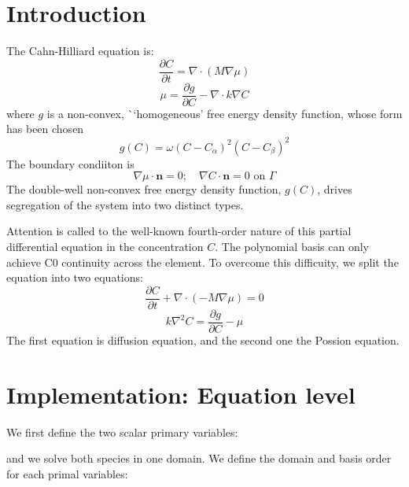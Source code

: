\hypertarget{growth_Introduction}{}\section{Introduction}\label{growth_Introduction}
The Cahn-\/\+Hilliard equation is\+: \[ \frac{\partial C}{\partial t}=\nabla\cdot(M\nabla\mu) \] \[ \mu=\frac{\partial g}{\partial C}-\nabla\cdot k\nabla C \] where $g$ is a non-\/convex, \`{}`homogeneous'\textquotesingle{} free energy density function, whose form has been chosen \[ g(C)=\omega(C-C_\alpha)^2(C-C_\beta)^2 \] The boundary condiiton is \[ \nabla\mu\cdot\boldsymbol{n}=0;\quad \nabla C\cdot\boldsymbol{n}=0 \text{ on }\Gamma \] The double-\/well non-\/convex free energy density function, $g(C)$, drives segregation of the system into two distinct types.

Attention is called to the well-\/known fourth-\/order nature of this partial differential equation in the concentration $C$. The polynomial basis can only achieve C0 continuity across the element. To overcome this difficuity, we split the equation into two equations\+: \[ \frac{\partial C}{\partial t}+\nabla\cdot(-M\nabla\mu)=0 \] \[ k\nabla^2 C=\frac{\partial g}{\partial C}-\mu \] The first equation is diffusion equation, and the second one the Possion equation. \hypertarget{growth_imple}{}\section{Implementation\+: Equation level}\label{growth_imple}
We first define the two scalar primary variables\+: 
\begin{DoxyCode}{0}
\end{DoxyCode}
 and we solve both species in one domain. We define the domain and basis order for each primal variables\+: 
\begin{DoxyCode}{0}
\end{DoxyCode}
